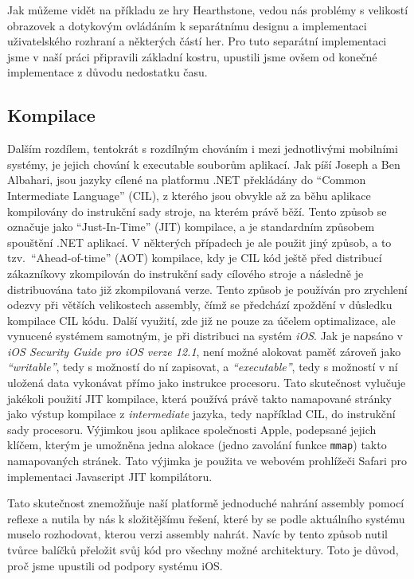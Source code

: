 Jak můžeme vidět na příkladu ze hry Hearthstone\citep{site:hearthstone}, vedou nás problémy s velikostí obrazovek a dotykovým ovládáním k separátnímu designu a implementaci uživatelského rozhraní a některých částí her. Pro tuto separátní implementaci jsme v naší práci připravili základní kostru, upustili jsme ovšem od konečné implementace z důvodu nedostatku času.

\subsection{Kompilace}
Dalším rozdílem, tentokrát s rozdílným chováním i mezi jednotlivými mobilními systémy, je jejich chování k executable souborům aplikací. Jak píší Joseph a Ben Albahari\citep[str.~3,4]{book:cs7nutshell}, jsou jazyky cílené na platformu .NET překládány do ``Common Intermediate Language'' (CIL), z kterého jsou obvykle až za běhu aplikace kompilovány do instrukční sady stroje, na kterém právě běží. Tento způsob se označuje jako ``Just-In-Time'' (JIT) kompilace, a je standardním způsobem spouštění .NET aplikací. V některých případech je ale použit jiný způsob, a to tzv.~``Ahead-of-time'' (AOT) kompilace, kdy je CIL kód ještě před distribucí zákazníkovy zkompilován do instrukční sady cílového stroje a následně je distribuována tato již zkompilovaná verze. Tento způsob je používán pro zrychlení odezvy při větších velikostech assembly, čímž se předchází zpoždění v důsledku kompilace CIL kódu. Další využití, zde již ne pouze za účelem optimalizace, ale vynucené systémem samotným, je při distribuci na systém \emph{iOS}\citep{site:aot}. Jak je napsáno v \textit{iOS Security Guide pro iOS verze 12.1}\citep[str.~27]{book:iossecurityguide}, není možné alokovat paměť zároveň jako \textit{``writable''}, tedy s možností do ní zapisovat, a \textit{``executable''}, tedy s možností v ní uložená data vykonávat přímo jako instrukce procesoru. Tato skutečnost vylučuje jakékoli použití JIT kompilace, která používá právě takto namapované stránky jako výstup kompilace z \textit{intermediate} jazyka, tedy například CIL, do instrukční sady procesoru. Výjimkou jsou aplikace společnosti Apple, podepsané jejich klíčem, kterým je umožněna jedna alokace (jedno zavolání funkce \texttt{mmap}) takto namapovaných stránek. Tato výjimka je použita ve webovém prohlížeči Safari pro implementaci Javascript JIT kompilátoru.  

Tato skutečnost znemožňuje naší platformě jednoduché nahrání assembly pomocí reflexe a nutila by nás k složitějšímu řešení, které by se podle aktuálního systému muselo rozhodovat, kterou verzi assembly nahrát. Navíc by tento způsob nutil tvůrce balíčků přeložit svůj kód pro všechny možné architektury. Toto je důvod, proč jsme upustili od podpory systému iOS.

